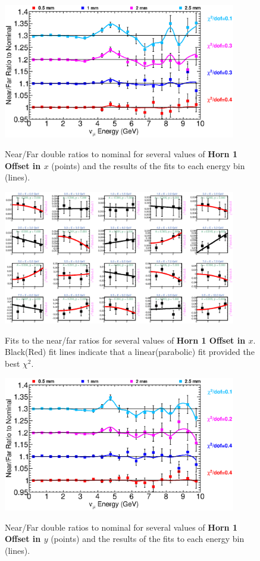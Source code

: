 \begin{figure}[ht]
  \begin{center}
    {\includegraphics[width=4.0in]{figures/Horn1XOffset_nof_summary.eps}}
  \end{center}
\caption{ Near/Far double ratios to nominal for several values of {\bf Horn 1 Offset in $x$} (points) and the results of the fits to each energy bin (lines).}
\end{figure}

\begin{figure}[hb]
  \begin{center}
    {\includegraphics[width=4.0in]{figures/Horn1XOffset_nof_fits.eps}}
  \end{center}
\caption{ Fits to the near/far ratios for several values of {\bf Horn 1 Offset in $x$}. Black(Red) fit lines indicate that a linear(parabolic) fit provided the best $\chi^2$. }
\end{figure}

\begin{figure}[ht]
  \begin{center}
    {\includegraphics[width=4.0in]{figures/Horn1YOffset_nof_summary.eps}}
  \end{center}
\caption{ Near/Far double ratios to nominal for several values of {\bf Horn 1 Offset in $y$} (points) and the results of the fits to each energy bin (lines).}
\end{figure}

